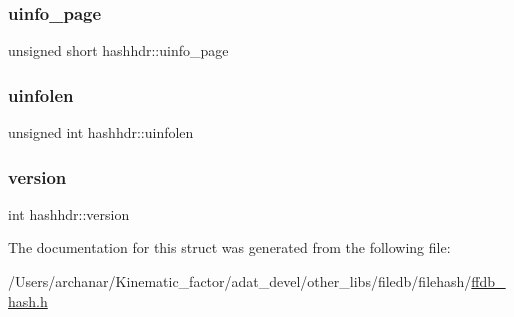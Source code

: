 \subsubsection{\texorpdfstring{uinfo\_page}{uinfo\_page}}
{\footnotesize\ttfamily unsigned short hashhdr\+::uinfo\+\_\+page}

\mbox{\label{structhashhdr_a5630409e6445f62540f56b8bed738de0}} 
\subsubsection{\texorpdfstring{uinfolen}{uinfolen}}
{\footnotesize\ttfamily unsigned int hashhdr\+::uinfolen}

\mbox{\label{structhashhdr_a482cd2214ac811ec00b887e2de4280b0}} 
\subsubsection{\texorpdfstring{version}{version}}
{\footnotesize\ttfamily int hashhdr\+::version}



The documentation for this struct was generated from the following file\+:\begin{DoxyCompactItemize}
\item 
/\+Users/archanar/\+Kinematic\+\_\+factor/adat\+\_\+devel/other\+\_\+libs/filedb/filehash/\mbox{\hyperlink{ffdb__hash_8h}{ffdb\+\_\+hash.\+h}}\end{DoxyCompactItemize}
